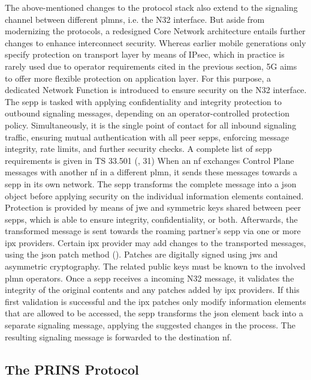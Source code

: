 The above-mentioned changes to the protocol stack also extend to the signaling channel between different \glspl{plmn}, i.e. the N32 interface.
But aside from modernizing the protocols, a redesigned Core Network architecture entails further changes to enhance interconnect security.
Whereas earlier mobile generations only specify protection on transport layer by means of IPsec, which in practice is rarely used due to operator requirements cited in the previous section, 5G aims to offer more flexible protection on application layer.
For this purpose, a dedicated Network Function is introduced to ensure security on the N32 interface.
The \gls{sepp} is tasked with applying confidentiality and integrity protection to outbound signaling messages, depending on an operator-controlled protection policy.
Simultaneously, it is the single point of contact for all inbound signaling traffic, ensuring mutual authentication with all peer \glspl{sepp}, enforcing message integrity, rate limits, and further security checks.
A complete list of \gls{sepp} requirements is given in TS 33.501 (\cite{3gpp.33.501}, 31)
When an \gls{nf} exchanges Control Plane messages with another \gls{nf} in a different \gls{plmn}, it sends these messages towards a \gls{sepp} in its own network.
The \gls{sepp} transforms the complete message into a \gls{json} object before applying security on the individual information elements contained.
Protection is provided by means of \gls{jwe} and symmetric keys shared between peer \glspl{sepp}, which is able to ensure integrity, confidentiality, or both.
Afterwards, the transformed message is sent towards the roaming partner's \gls{sepp} via one or more \gls{ipx} providers.
Certain \gls{ipx} provider may add changes to the transported messages, using the \gls{json} patch method (\cite{rfc6902}).
Patches are digitally signed using \gls{jws} and asymmetric cryptography.
The related public keys must be known to the involved \gls{plmn} operators.
Once a \gls{sepp} receives a incoming N32 message, it validates the integrity of the original contents and any patches added by \gls{ipx} providers.
If this first validation is successful and the \gls{ipx} patches only modify information elements that are allowed to be accessed, the \gls{sepp} transforms the \gls{json} element back into a separate signaling message, applying the suggested changes in the process.
The resulting signaling message is forwarded to the destination \gls{nf}.

\subsection{The PRINS Protocol}
